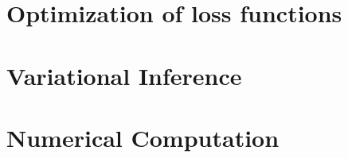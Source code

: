 \section{Optimization of loss functions}


\section{Variational Inference}


\section{Numerical Computation}

